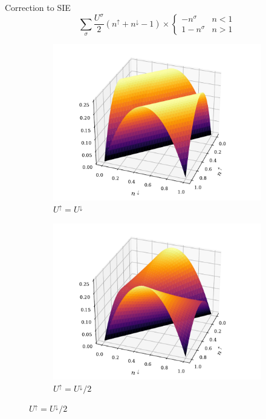 \documentclass[xcolor=table,aspectratio=169]{beamer}
\numberwithin{equation}{section}
\begin{document}
\begin{frame}{Correction to SIE}
    \begin{equation*}
        \sum_\sigma \frac{U^\sigma}{2} \left(n^\uparrow + n^\downarrow - 1\right) \times
        \begin{cases}
            -n^\sigma    & n < 1 \\
            1 - n^\sigma & n > 1
        \end{cases}
    \end{equation*}
    \begin{figure}[t!]
        \begin{subfigure}[b]{0.4\columnwidth}
            \includegraphics[width=\columnwidth]{figures/novel_u_correction_equal.pdf}
            \caption{$U^\uparrow = U^\downarrow$}
        \end{subfigure}
        \begin{subfigure}[b]{0.4\columnwidth}
            \includegraphics[width=\columnwidth]{figures/novel_u_correction.pdf}
            \caption{$U^\uparrow = U^\downarrow/2$}
        \end{subfigure}
    \end{figure}
\end{frame}
\end{document}
